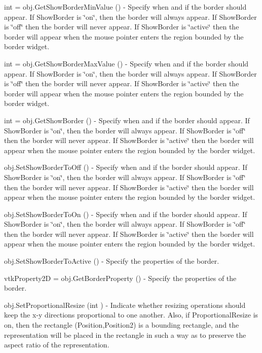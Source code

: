 \begin{DoxyItemize}
\item {\ttfamily int = obj.\-Get\-Show\-Border\-Min\-Value ()} -\/ Specify when and if the border should appear. If Show\-Border is \char`\"{}on\char`\"{}, then the border will always appear. If Show\-Border is \char`\"{}off\char`\"{} then the border will never appear. If Show\-Border is \char`\"{}active\char`\"{} then the border will appear when the mouse pointer enters the region bounded by the border widget.  
\item {\ttfamily int = obj.\-Get\-Show\-Border\-Max\-Value ()} -\/ Specify when and if the border should appear. If Show\-Border is \char`\"{}on\char`\"{}, then the border will always appear. If Show\-Border is \char`\"{}off\char`\"{} then the border will never appear. If Show\-Border is \char`\"{}active\char`\"{} then the border will appear when the mouse pointer enters the region bounded by the border widget.  
\item {\ttfamily int = obj.\-Get\-Show\-Border ()} -\/ Specify when and if the border should appear. If Show\-Border is \char`\"{}on\char`\"{}, then the border will always appear. If Show\-Border is \char`\"{}off\char`\"{} then the border will never appear. If Show\-Border is \char`\"{}active\char`\"{} then the border will appear when the mouse pointer enters the region bounded by the border widget.  
\item {\ttfamily obj.\-Set\-Show\-Border\-To\-Off ()} -\/ Specify when and if the border should appear. If Show\-Border is \char`\"{}on\char`\"{}, then the border will always appear. If Show\-Border is \char`\"{}off\char`\"{} then the border will never appear. If Show\-Border is \char`\"{}active\char`\"{} then the border will appear when the mouse pointer enters the region bounded by the border widget.  
\item {\ttfamily obj.\-Set\-Show\-Border\-To\-On ()} -\/ Specify when and if the border should appear. If Show\-Border is \char`\"{}on\char`\"{}, then the border will always appear. If Show\-Border is \char`\"{}off\char`\"{} then the border will never appear. If Show\-Border is \char`\"{}active\char`\"{} then the border will appear when the mouse pointer enters the region bounded by the border widget.  
\item {\ttfamily obj.\-Set\-Show\-Border\-To\-Active ()} -\/ Specify the properties of the border.  
\item {\ttfamily vtk\-Property2\-D = obj.\-Get\-Border\-Property ()} -\/ Specify the properties of the border.  
\item {\ttfamily obj.\-Set\-Proportional\-Resize (int )} -\/ Indicate whether resizing operations should keep the x-\/y directions proportional to one another. Also, if Proportional\-Resize is on, then the rectangle (Position,Position2) is a bounding rectangle, and the representation will be placed in the rectangle in such a way as to preserve the aspect ratio of the representation.  

\end{DoxyItemize}
